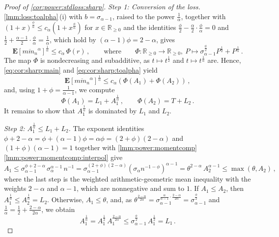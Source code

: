 \documentclass{article}
\newcommand{\R}{\mathbb{R}}
\newcommand{\Rp}{\R_{\geq0}}
\newcommand{\lab}{\left[} %
\newcommand{\rab}{\right]} %
\newcommand{\ab}[1]{\lab #1 \rab} %
\newcommand{\abOf}[1]{\!\ab{#1}} %
\newcommand{\lb}{\left(} %
\newcommand{\rb}{\right)} %
\newcommand{\br}[1]{\lb #1 \rb} %
\newcommand{\E}{\mathbf{E}} %
\newcommand{\EOf}[1]{\E\abOf{#1}}
\newcommand{\eqcm}{\,,} %
\newcommand{\eqfs}{\,.}
\newcommand{\ol}[2]{\overline{#1#2}}
\begin{document}
\begin{proof}[Proof of \cref{cor:power:stdloss:sharp}]
     \emph{Step 1: Conversion of the loss.}
     \cref{lmm:loss:toalpha}\,(i) with $b = \sigma_{\alpha-1}$, raised to the power $\frac1\alpha$, together with $(1+x)^{\frac\phi\alpha} \leq c_\alpha(1+x^{\frac\phi\alpha})$ for $x\in\Rp$ and the identities $\frac\phi2 - \frac\alpha2\cdot\frac\phi\alpha = 0$ and $\frac12 + \frac{\alpha-1}{2}\cdot\frac\phi\alpha = \frac1\alpha$, which hold by $(\alpha-1)\phi = 2-\alpha$, gives
     \begin{equation}\label{eq:cor:sharp:toalpha}
         \EOf{\ol{m}{m_n}^\alpha}^{\frac1\alpha}
         \leq
         c_\alpha\, \Phi(r)
         \eqcm\qquad\text{where}\qquad
         \Phi \colon \Rp\to\Rp,\ P \mapsto \sigma_{\alpha-1}^{\frac\phi2} P^{\frac12} + P^{\frac1\alpha}
         \eqfs
     \end{equation}
     The map $\Phi$ is nondecreasing and subadditive, as $t\mapsto t^{\frac12}$ and $t\mapsto t^{\frac1\alpha}$ are.
     Hence, \eqref{eq:cor:sharp:main} and \eqref{eq:cor:sharp:toalpha} yield
     \begin{equation}\label{eq:cor:sharp:split}
         \EOf{\ol{m}{m_n}^\alpha}^{\frac1\alpha}
         \leq
         c_\alpha \br{\Phi(A_1) + \Phi(A_2)}
         \eqcm
     \end{equation}
     and, using $1+\phi = \frac1{\alpha-1}$, we compute
     \begin{equation}\label{eq:cor:sharp:phiA}
         \Phi(A_1) = L_1 + A_1^{\frac1\alpha}
         \eqcm\qquad
         \Phi(A_2) = T + L_2
         \eqfs
     \end{equation}
     It remains to show that $A_1^{\frac1\alpha}$ is dominated by $L_1$ and $L_2$.
     
     \emph{Step 2: $A_1^{\frac1\alpha} \leq L_1 + L_2$.}
     The exponent identities $\phi + 2 - \alpha = \phi + (\alpha-1)\phi = \alpha\phi = (2+\phi)(2-\alpha)$ and $(1+\phi)(\alpha-1) = 1$ together with \cref{lmm:power:momentcomp}\,\ref{lmm:power:momentcomp:interpol} give
     \begin{equation}
         A_1
         \leq
         \sigma_{\alpha-1}^{\phi + 2-\alpha}\, \sigma_\alpha^{\alpha-1}\, n^{-1}
         =
         \sigma_{\alpha-1}^{(2+\phi)(2-\alpha)} \br{\sigma_\alpha n^{-1-\phi}}^{\alpha-1}
         =
         \theta^{2-\alpha}\, A_2^{\alpha-1}
         \leq
         \max(\theta, A_2)
         \eqcm
     \end{equation}
     where the last step is the weighted arithmetic-geometric mean inequality with the weights $2-\alpha$ and $\alpha-1$, which are nonnegative and sum to $1$.
     If $A_1 \leq A_2$, then $A_1^{\frac1\alpha} \leq A_2^{\frac1\alpha} = L_2$.
     Otherwise, $A_1 \leq \theta$, and, as $\theta^{\frac{2-\alpha}{2\alpha}} = \sigma_{\alpha-1}^{\frac{\alpha}{\alpha-1}\cdot\frac{2-\alpha}{2\alpha}} = \sigma_{\alpha-1}^{\frac\phi2}$ and $\frac1\alpha = \frac12 + \frac{2-\alpha}{2\alpha}$, we obtain
     \begin{equation}
         A_1^{\frac1\alpha}
         =
         A_1^{\frac12}\, A_1^{\frac{2-\alpha}{2\alpha}}
         \leq
         \sigma_{\alpha-1}^{\frac\phi2}\, A_1^{\frac12}
         =
         L_1
         \eqfs
     \end{equation}
     

\end{proof}
\end{document}
